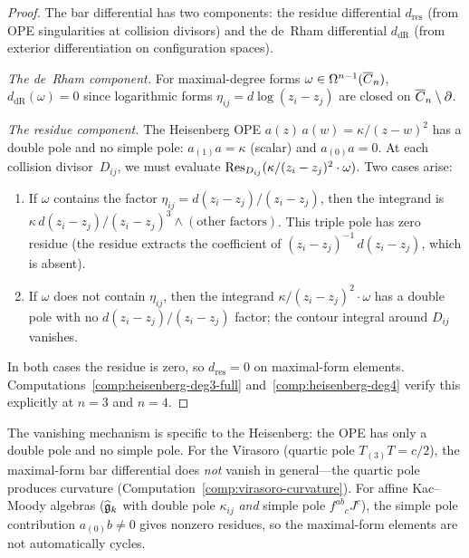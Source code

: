 \begin{proof}
The bar differential has two components: the residue differential $d_{\mathrm{res}}$
(from OPE singularities at collision divisors) and the de~Rham differential
$d_{\mathrm{dR}}$ (from exterior differentiation on configuration spaces).

\emph{The de~Rham component.}
For maximal-degree forms $\omega \in \Omega^{n-1}(\overline{C}_n)$,
$d_{\mathrm{dR}}(\omega) = 0$ since logarithmic forms $\eta_{ij} = d\log(z_i - z_j)$
are closed on $\overline{C}_n \setminus \partial$.

\emph{The residue component.}
The Heisenberg OPE $a(z)\,a(w) = \kappa/(z-w)^2$ has a double pole
and no simple pole: $a_{(1)}a = \kappa$ (scalar) and $a_{(0)}a = 0$.
At each collision divisor~$D_{ij}$, we must evaluate
$\operatorname{Res}_{D_{ij}}(\kappa/(z_i - z_j)^2 \cdot \omega)$.
Two cases arise:
\begin{enumerate}
\item If $\omega$ contains the factor $\eta_{ij} = d(z_i-z_j)/(z_i-z_j)$,
  then the integrand is $\kappa\,d(z_i-z_j)/(z_i-z_j)^3 \wedge (\text{other factors})$.
  This triple pole has zero residue (the residue extracts the coefficient
  of $(z_i-z_j)^{-1}\,d(z_i-z_j)$, which is absent).
\item If $\omega$ does not contain $\eta_{ij}$, then the integrand
  $\kappa/(z_i-z_j)^2 \cdot \omega$ has a double pole with no
  $d(z_i-z_j)/(z_i-z_j)$ factor; the contour integral around $D_{ij}$
  vanishes.
\end{enumerate}
In both cases the residue is zero, so $d_{\mathrm{res}} = 0$ on
maximal-form elements.
Computations~\ref{comp:heisenberg-deg3-full} and~\ref{comp:heisenberg-deg4}
verify this explicitly at $n = 3$ and $n = 4$.
\end{proof}

\begin{remark}\label{rem:maximal-form-mechanism}
The vanishing mechanism is specific to the Heisenberg: the OPE has
only a double pole and no simple pole.  For the Virasoro
(quartic pole $T_{(3)}T = c/2$), the maximal-form bar differential
does \emph{not} vanish in general---the quartic pole produces curvature
(Computation~\ref{comp:virasoro-curvature}).
For affine Kac--Moody algebras ($\widehat{\mathfrak{g}}_k$ with double pole $\kappa_{ij}$
\emph{and} simple pole $f^{ab}{}_c J^c$), the simple pole contribution
$a_{(0)}b \neq 0$ gives nonzero residues, so the maximal-form
elements are not automatically cycles.
\end{remark}



